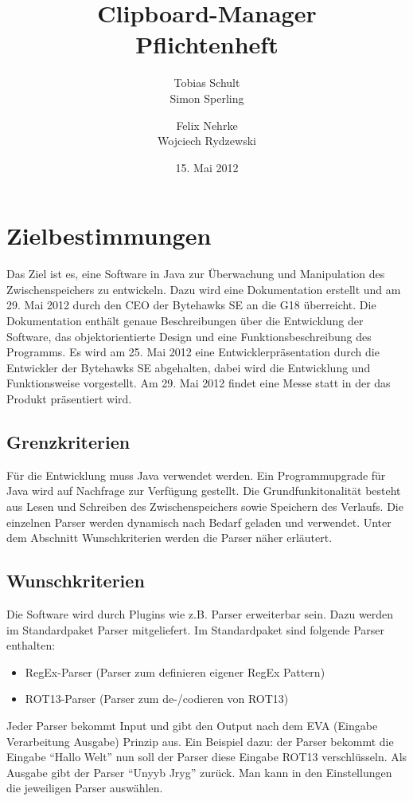 \documentclass[a4paper,11pt,abstracton,titlepage]{scrartcl}
\title{Clipboard-Manager\\Pflichtenheft}
\author{Tobias Schult \\  Simon Sperling \and  Felix Nehrke \\  Wojciech
Rydzewski}
\date{15. Mai 2012}
\begin{document}
\maketitle

\tableofcontents
\thispagestyle{empty}
\newpage
\setlength{\parskip}{1em}
\setcounter{page}{1}


\section{Zielbestimmungen} 
Das Ziel ist es, eine Software in Java zur Überwachung und Manipulation des
Zwischenspeichers zu entwickeln.  Dazu wird eine Dokumentation erstellt und am
29. Mai 2012 durch den CEO der Bytehawks SE an die G18 überreicht.  Die
Dokumentation enthält genaue Beschreibungen über die Entwicklung der Software,
das objektorientierte Design und eine Funktionsbeschreibung des Programms.  Es
wird am 25. Mai 2012 eine Entwicklerpräsentation durch die Entwickler der
Bytehawks SE abgehalten, dabei wird die Entwicklung und Funktionsweise
vorgestellt. Am 29. Mai 2012 findet eine Messe statt in der das Produkt
präsentiert wird.

\subsection{Grenzkriterien} 
Für die Entwicklung muss Java verwendet werden. Ein
Programmupgrade für Java  wird auf Nachfrage zur Verfügung
gestellt.  Die Grundfunkitonalität besteht aus Lesen und Schreiben des
Zwischenspeichers sowie Speichern des Verlaufs.  Die einzelnen Parser werden
dynamisch nach Bedarf geladen und verwendet.  Unter dem Abschnitt
Wunschkriterien werden die Parser näher erläutert.  

\subsection{Wunschkriterien}
Die Software wird durch Plugins wie z.B. Parser erweiterbar sein. Dazu werden
im Standardpaket Parser mitgeliefert. Im Standardpaket sind folgende Parser
enthalten:
\begin{itemize} 
\item RegEx-Parser (Parser zum definieren
eigener RegEx Pattern) 
\item ROT13-Parser (Parser zum de-/codieren von ROT13)
\end{itemize}
Jeder Parser bekommt Input und gibt den Output nach dem
EVA (Eingabe Verarbeitung Ausgabe) Prinzip aus. Ein Beispiel dazu: der Parser
bekommt die Eingabe "`Hallo Welt"' nun soll der Parser diese Eingabe ROT13
verschlüsseln.  Als Ausgabe gibt der Parser "`Unyyb Jryg"' zurück.  Man kann in
den Einstellungen die jeweiligen Parser auswählen.
\end{document}
